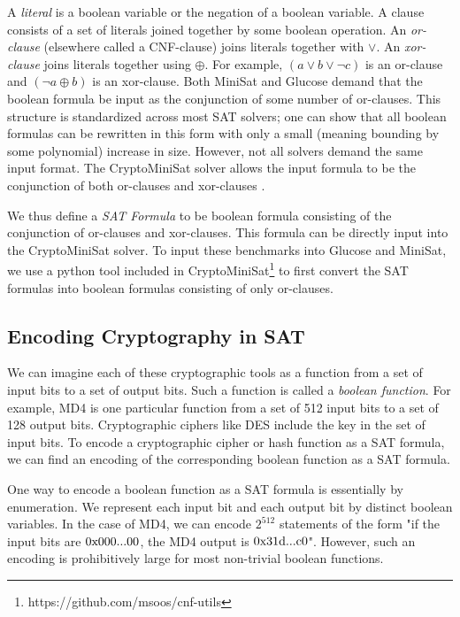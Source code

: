 A \emph{literal} is a boolean variable or the negation of a boolean variable. A clause consists of a set of literals joined together by some boolean operation. An \emph{or-clause} (elsewhere called a CNF-clause) joins literals together with $\lor$. An \emph{xor-clause} joins literals together using $\oplus$. For example, $(a \lor b \lor \neg c)$ is an or-clause and $(\neg a \oplus b)$ is an xor-clause. Both MiniSat and Glucose demand that the boolean formula be input as the conjunction of some number of or-clauses. This structure is standardized across most SAT solvers; one can show that all boolean formulas can be rewritten in this form with only a small (meaning bounding by some polynomial) increase in size. However, not all solvers demand the same input format. The CryptoMiniSat \cite{SNC09} solver allows the input formula to be the conjunction of both or-clauses and xor-clauses . 

We thus define a \emph{SAT Formula} to be boolean formula consisting of the conjunction of or-clauses and xor-clauses. This formula can be directly input into the CryptoMiniSat solver. To input these benchmarks into Glucose and MiniSat, we use a python tool included in CryptoMiniSat\footnote{https://github.com/msoos/cnf-utils} to first convert the SAT formulas into boolean formulas consisting of only or-clauses.


\subsection{Encoding Cryptography in SAT}
\label{sec:encoding:desc}
We can imagine each of these cryptographic tools as a function from a set of input bits to a set of output 
bits. Such a function is called a \emph{boolean function}. For example, MD4 is one particular function from a set of 512 input bits to a set of 128 output bits. Cryptographic ciphers like DES include the key in the set of input bits. To encode a cryptographic cipher or hash function as a SAT formula, we can find an encoding of the corresponding boolean function as a SAT formula.

One way to encode a boolean function as a SAT formula is essentially by enumeration. We represent each input bit and each output bit by distinct boolean variables. In the case of MD4, we can encode $2^{512}$ statements of the form "if the input bits are $0\text{x000...00}$, the MD4 output is $0\text{x31d...c0}$". However, such an encoding is prohibitively large for most non-trivial boolean functions.

